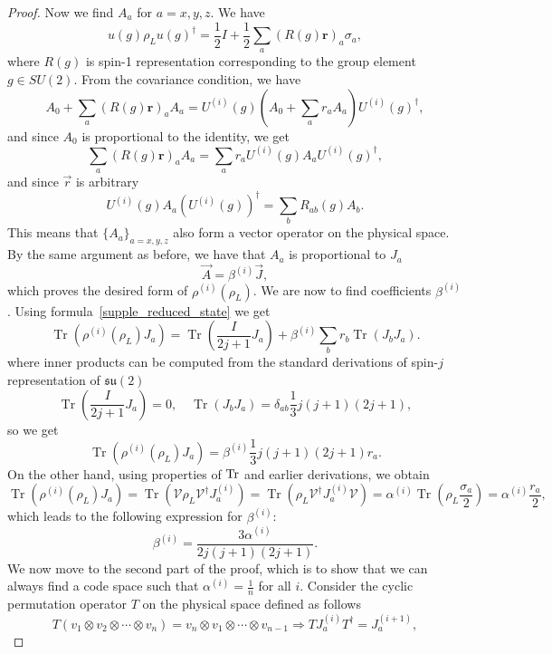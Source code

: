\documentclass[10pt,twocolumn,superscriptaddress,aps,amsmath,amssymb,citeautoscript,floatfix,prx]{revtex4-2}
\theoremstyle{plain}
\theoremstyle{plain}
\theoremstyle{plain}
\theoremstyle{plain}
\theoremstyle{plain}
\theoremstyle{plain}
\theoremstyle{plain}
\theoremstyle{definition}
\theoremstyle{plain}
\begin{document}
\begin{appendix}
\begin{proof}
    Now we find $A_a$ for $a=x, y, z$. We have
    \[
    u(g) \rho_L u(g)^{\dagger}=\frac{1}{2} I+\frac{1}{2} \sum_a(R(g) \mathbf{r})_a \sigma_a,
    \]
    where $R(g)$ is spin-1 representation corresponding to the group element $g\in SU(2)$. From the covariance condition, we have
    \[
    A_0+\sum_a(R(g) \mathbf{r})_a A_a=U^{(i)}(g)\left(A_0+\sum_a r_a A_a\right) U^{(i)}(g)^{\dagger},
    \]
    and since $A_0$ is proportional to the identity, we get
    \[
    \sum_a(R(g) \mathbf{r})_a A_a=\sum_a r_a U^{(i)}(g) A_a U^{(i)}(g)^{\dagger},
    \]
    and since $\vec{r}$ is arbitrary
    \[
    U^{(i)}(g) A_a (U^{(i)}(g))^{\dagger}=\sum_b R_{a b}(g) A_b.
    \]
    This means that $\{A_a\}_{a=x, y, z}$ also form a vector operator on the physical space.
    By the same argument as before, we have that $A_a$ is proportional to $J_a$
    \[
    \vec{A}=\beta^{(i)} \vec{J},
    \] 
    which proves the desired form of $\rho^{(i)}\left(\rho_L\right)$. We are now to find coefficients $\beta^{(i)}$. 
    Using formula~\eqref{supple_reduced_state} we get
    \[
    \operatorname{Tr}\left(\rho^{(i)}\left(\rho_L\right) J_a\right)=\operatorname{Tr}\left(\frac{I}{2 j+1} J_a\right)+\beta^{(i)} \sum_b r_b \operatorname{Tr}\left(J_b J_a\right).
    \]
    where inner products can be computed from the standard derivations of spin-$j$ representation of $\mathfrak{su}(2)$
    \[
    \operatorname{Tr}\left(\frac{I}{2 j+1} J_a\right)=0, \quad \operatorname{Tr}\left(J_b J_a\right)=\delta_{a b} \frac{1}{3} j(j+1)(2 j+1),
    \]
    so we get
    \[
    \operatorname{Tr}\left(\rho^{(i)}\left(\rho_L\right) J_a\right)=\beta^{(i)} \frac{1}{3} j(j+1)(2 j+1) r_a .
    \]
    On the other hand, using properties of $\Tr$ and earlier derivations, we obtain
    \[
    \operatorname{Tr}\left(\rho^{(i)}\left(\rho_L\right) J_a\right)=\operatorname{Tr}\left(\mathcal{V} \rho_L \mathcal{V}^{\dagger} J_a^{(i)}\right)=\operatorname{Tr}\left(\rho_L \mathcal{V}^{\dagger} J_a^{(i)} \mathcal{V}\right)=\alpha^{(i)} \operatorname{Tr}\left(\rho_L \frac{\sigma_a}{2}\right)=\alpha^{(i)} \frac{r_a}{2},
    \]
    which leads to the following expression for $\beta^{(i)}$:
    \[
    \beta^{(i)}=\frac{3 \alpha^{(i)}}{2 j(j+1)(2 j+1)} .
    \]
    We now move to the second part of the proof, which is to show that we can always find a code space such that $\alpha^{(i)} = \frac{1}{n}$ for all $i$.
    Consider the cyclic permutation operator $T$ on the physical space defined as follows
    \[
        T\left(v_1 \otimes v_2 \otimes \cdots \otimes v_n\right)=v_n \otimes v_1 \otimes \cdots \otimes v_{n-1} \Longrightarrow T J_a^{(i)} T^{\dagger}=J_a^{(i+1)},
\]
\end{proof}
\end{appendix}
\end{document}
